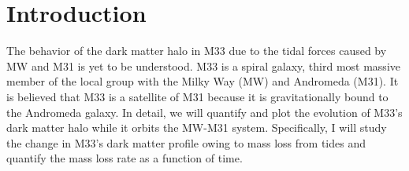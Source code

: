 \documentclass{aastex63}
\begin{document}


\section{Introduction} \label{sec:intro}

The behavior of the dark matter halo in M33 due to the tidal forces caused by MW and M31 is yet to be understood. M33 is a spiral galaxy, third most massive member of the local group with the Milky Way (MW) and Andromeda (M31). It is believed that M33 is a satellite of M31 because it is gravitationally bound to the Andromeda galaxy. In detail, we will quantify and plot the evolution of M33's dark matter halo while it orbits the MW-M31 system. Specifically, I will study the change in M33’s dark matter profile owing to mass loss from tides and quantify the mass loss rate as a function of time.
\vspace{1.5mm}
\end{document}
